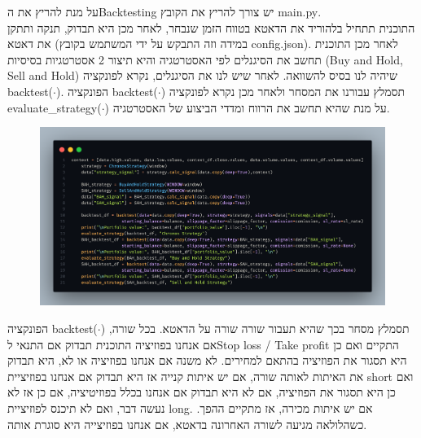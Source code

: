 \documentclass[a4paper,11pt]{article}
\newcommand{\te}[1]{\textenglish{#1}}
\begin{document}
\begin{RTL}
על מנת להריץ את ה\te{Backtesting} יש צורך להריץ את הקובץ \te{main.py}. \\
התוכנית תתחיל בלהוריד את הדאטא בטווח הזמן שנבחר, לאחר מכן היא תבדוק, תנקה ותתקן את דאטא (במידה וזה התבקש על ידי המשתמש בקובץ \te{config.json}). לאחר מכן התוכנית תחשב את הסיגנלים לפי האסטרטגיה והיא תיצור 2 אסטרטגיות בסיסיות (\te{Buy and Hold, Sell and Hold}) שיהיה לנו בסיס להשוואה.
לאחר שיש לנו את הסיגנלים, נקרא לפונקציה \te{backtest($\cdot$)}. הפונקציה \te{backtest($\cdot$)} תסמלץ עבורנו את המסחר ולאחר מכן נקרא לפונקציה \te{evaluate\_strategy($\cdot$)} על מנת שהיא תחשב את הרווח ומדדי הביצוע של האסטרטגיה.
\begin{figure}[H]
    \centering
    \includegraphics[width=.9\textwidth]{backtesting.png}
\end{figure}
הפונקציה \te{backtest($\cdot$)} תסמלץ מסחר בכך שהיא תעבור שורה שורה על הדאטא. בכל שורה, אם אנחנו בפוזיציה התוכנית תבדוק אם התנאי ל\te{Stop loss / Take profit} התקיים ואם כן היא תסגור את הפוזיציה בהתאם למחירים.
לא משנה אם אנחנו בפוזיציה או לא, היא תבדוק את האיתות לאותה שורה, אם יש איתות קנייה אז היא תבדוק אם אנחנו בפוזיציית \te{short} ואם כן היא תסגור את הפוזיציה, אם לא היא תבדוק אם אנחנו בכלל בפוזיטיציה, אם כן אז לא נעשה דבר, ואם לא תיכנס לפוזיציית \te{long}. אם יש איתות מכירה, אז מתקיים ההפך.
 כשהלולאה מגיעה לשורה האחרונה בדאטא, אם אנחנו בפוזיצייה היא סוגרת אותה.




\end{RTL}
\end{document}
